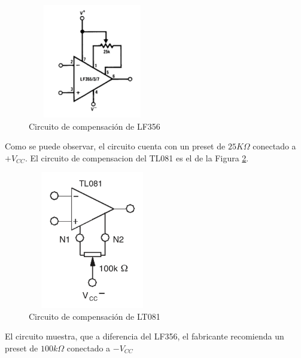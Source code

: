 \begin{figure}[ht]                                                       
    \centering\includegraphics[width=0.5\textwidth, height=5cm]{../Ex3/Figuras/fig_6.png}
     \caption{Circuito de compensación de LF356}
     \label{compensacion_LF356}
     \end{figure}

Como se puede observar, el circuito cuenta con un preset de $25K\Omega$ conectado a $+V_{CC}$. El circuito de compensacion del TL081 es el 
de la Figura \ref{compensacion_LT081}.


\begin{figure}[h!]                                                       
    \centering\includegraphics[width=0.5\textwidth, height=6cm]{../Ex3/Figuras/fig_7.png}

    \caption{Circuito de compensación de LT081}
     \label{compensacion_LT081}
     \end{figure}

 
El circuito muestra, que a diferencia del LF356, el fabricante recomienda un preset de $100k\Omega$ conectado a $-V_{CC}$

